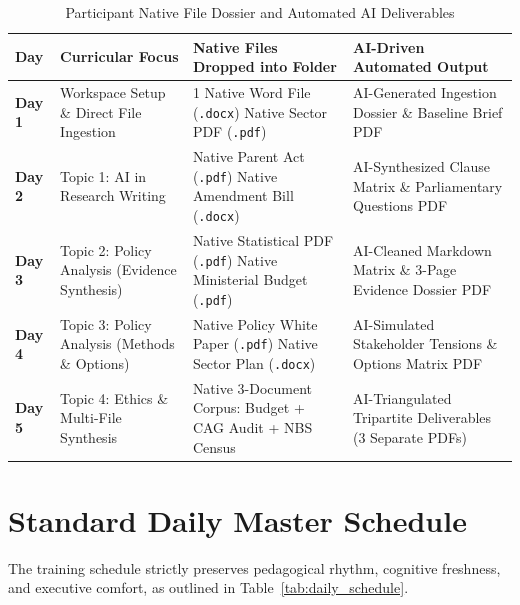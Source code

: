 \documentclass[11pt, a4paper]{report}
\begin{document}
\begin{table}[htbp]
\centering
\caption{Participant Native File Dossier and Automated AI Deliverables}
\label{tab:auto_portfolio}
\vspace{0.2cm}
\begin{tabular}{@{}>{\bfseries}p{1.4cm}p{3.2cm}p{5.0cm}p{4.6cm}@{}}
\toprule
Day & Curricular Focus & Native Files Dropped into Folder & AI-Driven Automated Output \\
\midrule
Day 1 & Workspace Setup \& Direct File Ingestion & 1 Native Word File (\texttt{.docx}) \newline 1 Native Sector PDF (\texttt{.pdf}) & AI-Generated Ingestion Dossier \& Baseline Brief PDF \\
\addlinespace
Day 2 & Topic 1: AI in Research Writing & Native Parent Act (\texttt{.pdf}) \newline Native Amendment Bill (\texttt{.docx}) & AI-Synthesized Clause Matrix \& Parliamentary Questions PDF \\
\addlinespace
Day 3 & Topic 2: Policy Analysis (Evidence Synthesis) & Native Statistical PDF (\texttt{.pdf}) \newline Native Ministerial Budget (\texttt{.pdf}) & AI-Cleaned Markdown Matrix \& 3-Page Evidence Dossier PDF \\
\addlinespace
Day 4 & Topic 3: Policy Analysis (Methods \& Options) & Native Policy White Paper (\texttt{.pdf}) \newline Native Sector Plan (\texttt{.docx}) & AI-Simulated Stakeholder Tensions \& Options Matrix PDF \\
\addlinespace
Day 5 & Topic 4: Ethics \& Multi-File Synthesis & Native 3-Document Corpus: \newline Budget + CAG Audit + NBS Census & AI-Triangulated Tripartite Deliverables (3 Separate PDFs) \\
\bottomrule
\end{tabular}
\end{table}

\section{Standard Daily Master Schedule}
The training schedule strictly preserves pedagogical rhythm, cognitive freshness, and executive comfort, as outlined in Table~\ref{tab:daily_schedule}.
\end{document}

